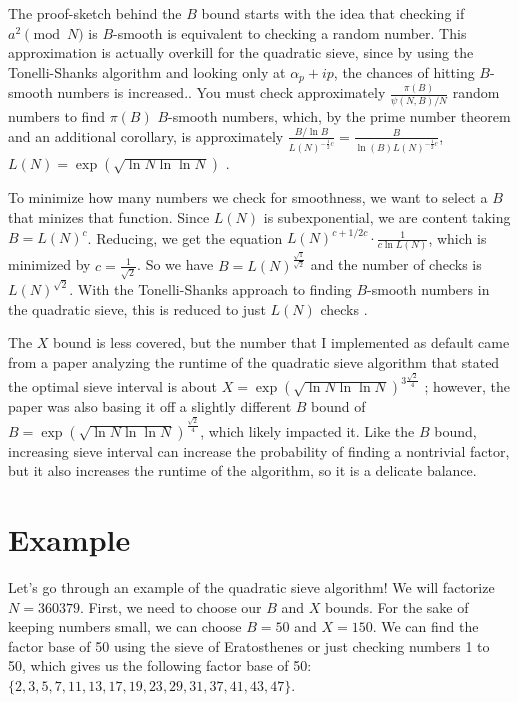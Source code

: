 \documentclass[11pt,reqno]{amsart}
\theoremstyle{definition}
\begin{document}
The proof-sketch behind the $B$ bound starts with the idea that checking if $a^2 \pmod{N}$ is $B$-smooth is equivalent to checking a random number. This approximation is actually overkill for the quadratic sieve, since by using the Tonelli-Shanks algorithm and looking only at $\alpha_p + ip$, the chances of hitting $B$-smooth numbers is increased.. You must check approximately $\frac{\pi(B)}{\psi(N, B)/N}$ random numbers to find $\pi(B)$ $B$-smooth numbers, which, by the prime number theorem and an additional corollary, is approximately $\frac{B/\ln{B}}{L(N)^{-\frac{1}{2}c}} = \frac{B}{\ln(B)L(N)^{-\frac{1}{2}c}}$, $L(N) = \exp(\sqrt{\ln N \ln \ln N})$ \cite{silverman2008introduction}.

To minimize how many numbers we check for smoothness, we want to select a $B$ that minizes that function. Since $L(N)$ is subexponential, we are content taking $B = L(N)^c$. Reducing, we get the equation $L(N)^{c+1/2c} \cdot \frac{1}{c\ln{L(N)}}$, which is minimized by $c = \frac{1}{\sqrt{2}}$. So we have $B = L(N)^{\frac{\sqrt{1}}{\sqrt{2}}}$ and the number of checks is $L(N)^{\sqrt{2}}$. With the Tonelli-Shanks approach to finding $B$-smooth numbers in the quadratic sieve, this is reduced to just $L(N)$ checks \cite{silverman2008introduction}.

The $X$ bound is less covered, but the number that I implemented as default came from a paper analyzing the runtime of the quadratic sieve algorithm that stated the optimal sieve interval is about $X = \exp(\sqrt{\ln N \ln \ln N})^{3\frac{\sqrt{2}}{4}}$ \cite{landquist2001quadratic}; however, the paper was also basing it off a slightly different $B$ bound of $B = \exp(\sqrt{\ln N \ln \ln N})^{\frac{\sqrt{2}}{4}}$, which likely impacted it. Like the $B$ bound, increasing sieve interval can increase the probability of finding a nontrivial factor, but it also increases the runtime of the algorithm, so it is a delicate balance.

\section{Example}
\label{sec:example}

Let's go through an example of the quadratic sieve algorithm! We will factorize $N = 360379$. First, we need to choose our $B$ and $X$ bounds. For the sake of keeping numbers small, we can choose $B = 50$ and $X = 150$. We can find the factor base of 50 using the sieve of Eratosthenes or just checking numbers 1 to 50, which gives us the following factor base of 50: $\{2, 3, 5, 7, 11, 13, 17, 19, 23, 29, 31, 37, 41, 43, 47\}$. 
\end{document}

